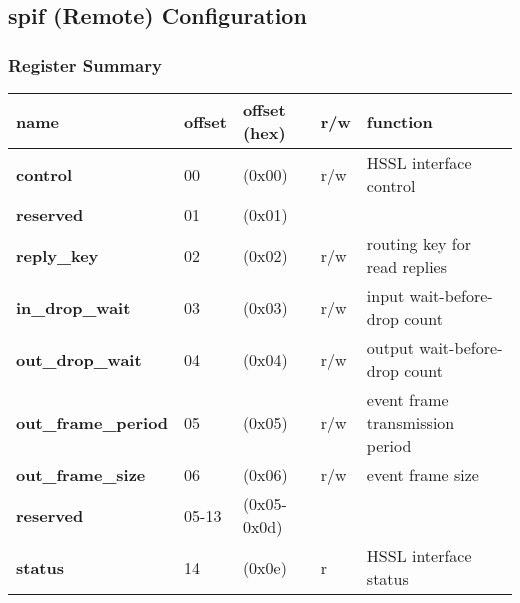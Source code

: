 \documentclass[11pt,a4paper,twoside]{article}
\begin{document}
\clearpage
\subsection{spif (Remote) Configuration}


\subsubsection*{Register Summary}

\begin{center}
\begin{table}[!h]
	\begin{tabularx}{\textwidth}{| p{37mm} p{13mm} p{21mm} p{6mm} X |}
		\hline
		\textbf{name}                        & \textbf{offset}            & \textbf{offset} (hex)          & \textbf{r/w}        & \textbf{function} \\%
		\hline
		\hline
		\textbf{control}                     & 00                         & (0x00)                         & r/w                 & HSSL interface control \\%
		\cellcolor{gray!25}\textbf{reserved} & \cellcolor{gray!25}01      & \cellcolor{gray!25}(0x01) & \cellcolor{gray!25} & \cellcolor{gray!25}\\%
		\textbf{reply\_key}                  & 02                         & (0x02)                         & r/w                 & routing key for read replies \\%
		\textbf{in\_drop\_wait}              & 03                         & (0x03)                         & r/w                 & input wait-before-drop count \\%
		\textbf{out\_drop\_wait}             & 04                         & (0x04)                         & r/w                 & output wait-before-drop count \\%
		\textbf{out\_frame\_period}          & 05                         & (0x05)                         & r/w                 & event frame transmission period \\%
		\textbf{out\_frame\_size}            & 06                         & (0x06)                         & r/w                 & event frame size \\%
		\cellcolor{gray!25}\textbf{reserved} & \cellcolor{gray!25}05-13   & \cellcolor{gray!25}(0x05-0x0d) & \cellcolor{gray!25} & \cellcolor{gray!25}\\%
		\textbf{status}                      & 14                         & (0x0e)                         & r                   & HSSL interface status \\%

\end{tabularx}
\end{table}
\end{center}
\end{document}
